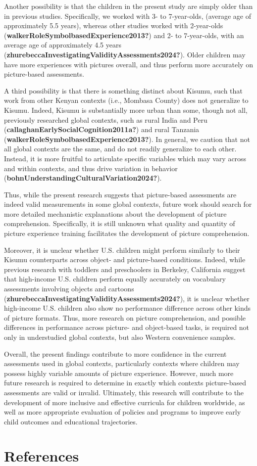 \documentclass[10pt, letterpaper]{article}
\begin{document}
Another possibility is that the children in the present study are simply
older than in previous studies. Specifically, we worked with 3- to
7-year-olds, (average age of approximately 5.5 years), whereas other
studies worked with 2-year-olds
(\textbf{walkerRoleSymbolbasedExperience2013?}) and 2- to 7-year-olds,
with an average age of approximately 4.5 years
(\textbf{zhurebeccaInvestigatingValidityAssessments2024?}). Older
children may have more experiences with pictures overall, and thus
perform more accurately on picture-based assessments.

A third possibility is that there is something distinct about Kisumu,
such that work from other Kenyan contexts (i.e., Mombasa County) does
not generalize to Kisumu. Indeed, Kisumu is substantially more urban
than some, though not all, previously researched global contexts, such
as rural India and Peru (\textbf{callaghanEarlySocialCognition2011a?})
and rural Tanzania (\textbf{walkerRoleSymbolbasedExperience2013?}). In
general, we caution that not all global contexts are the same, and do
not readily generalize to each other. Instead, it is more fruitful to
articulate specific variables which may vary across and within contexts,
and thus drive variation in behavior
(\textbf{bohnUnderstandingCulturalVariation2024?}).

Thus, while the present research suggests that picture-based assessments
are indeed valid measurements in some global contexts, future work
should search for more detailed mechanistic explanations about the
development of picture comprehension. Specifically, it is still unknown
what quality and quantity of picture experience training facilitates the
development of picture comprehension.

Moreover, it is unclear whether U.S. children might perform similarly to
their Kisumu counterparts across object- and picture-based conditions.
Indeed, while previous research with toddlers and preschoolers in
Berkeley, California suggest that high-income U.S. children perform
equally accurately on vocabulary assessments involving objects and
cartoons (\textbf{zhurebeccaInvestigatingValidityAssessments2024?}), it
is unclear whether high-income U.S. children also show no performance
difference across other kinds of picture formats. Thus, more research on
picture comprehension, and possible differences in performance across
picture- and object-based tasks, is required not only in understudied
global contexts, but also Western convenience samples.

Overall, the present findings contribute to more confidence in the
current assessments used in global contexts, particularly contexts where
children may possess highly variable amounts of picture experience.
However, much more future research is required to determine in exactly
which contexts picture-based assessments are valid or invalid.
Ultimately, this research will contribute to the development of more
inclusive and effective curricula for children worldwide, as well as
more appropriate evaluation of policies and programs to improve early
child outcomes and educational trajectories.

\section{References}\label{references}

\setlength{\parindent}{-0.1in} 
\setlength{\leftskip}{0.125in}

\noindent


\end{document}
